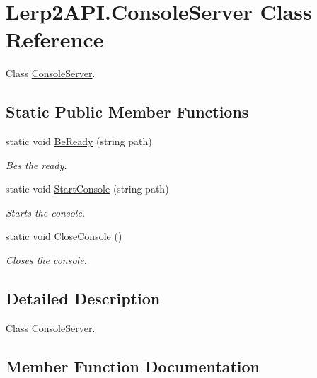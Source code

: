 \hypertarget{class_lerp2_a_p_i_1_1_console_server}{}\section{Lerp2\+A\+P\+I.\+Console\+Server Class Reference}
\label{class_lerp2_a_p_i_1_1_console_server}


Class \hyperlink{class_lerp2_a_p_i_1_1_console_server}{Console\+Server}.  


\subsection*{Static Public Member Functions}
\begin{DoxyCompactItemize}
\item 
static void \hyperlink{class_lerp2_a_p_i_1_1_console_server_af95048182d2bf4acff1ebbcd18466bdc}{Be\+Ready} (string path)
\begin{DoxyCompactList}\small\item\em Bes the ready. \end{DoxyCompactList}\item 
static void \hyperlink{class_lerp2_a_p_i_1_1_console_server_ababcc7dcd82a5ff056e3d511ff573f55}{Start\+Console} (string path)
\begin{DoxyCompactList}\small\item\em Starts the console. \end{DoxyCompactList}\item 
static void \hyperlink{class_lerp2_a_p_i_1_1_console_server_a9f9bdc6bc8ee74f1193d9d55ba7b0ea6}{Close\+Console} ()
\begin{DoxyCompactList}\small\item\em Closes the console. \end{DoxyCompactList}\end{DoxyCompactItemize}


\subsection{Detailed Description}
Class \hyperlink{class_lerp2_a_p_i_1_1_console_server}{Console\+Server}. 



\subsection{Member Function Documentation}
\mbox{\label{class_lerp2_a_p_i_1_1_console_server_af95048182d2bf4acff1ebbcd18466bdc}} 
